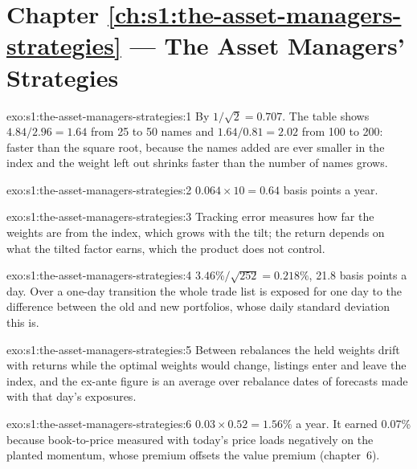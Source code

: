 \section*{Chapter \ref{ch:s1:the-asset-managers-strategies} --- The Asset Managers' Strategies}

\begin{solution}{exo:s1:the-asset-managers-strategies:1}
By $1/\sqrt{2} = 0.707$. The table shows $4.84/2.96 = 1.64$ from 25 to 50 names and $1.64/0.81 = 2.02$ from 100 to 200: faster than the square root,
because the names added are ever smaller in the index and the weight left out shrinks faster than the number of names grows.
\end{solution}

\begin{solution}{exo:s1:the-asset-managers-strategies:2}
$0.064 \times 10 = 0.64$ basis points a year.
\end{solution}

\begin{solution}{exo:s1:the-asset-managers-strategies:3}
Tracking error measures how far the weights are from the index, which grows with the tilt; the return depends on what the tilted factor earns, which the
product does not control.
\end{solution}

\begin{solution}{exo:s1:the-asset-managers-strategies:4}
$3.46\%/\sqrt{252} = 0.218\%$, 21.8 basis points a day. Over a one-day transition the whole trade list is exposed for one day to the difference between the
old and new portfolios, whose daily standard deviation this is.
\end{solution}

\begin{solution}{exo:s1:the-asset-managers-strategies:5}
Between rebalances the held weights drift with returns while the optimal weights would change, listings enter and leave the index, and the ex-ante figure
is an average over rebalance dates of forecasts made with that day's exposures.
\end{solution}

\begin{solution}{exo:s1:the-asset-managers-strategies:6}
$0.03 \times 0.52 = 1.56\%$ a year. It earned 0.07\% because book-to-price measured with today's price loads negatively on the planted momentum, whose
premium offsets the value premium (chapter~6).
\end{solution}

